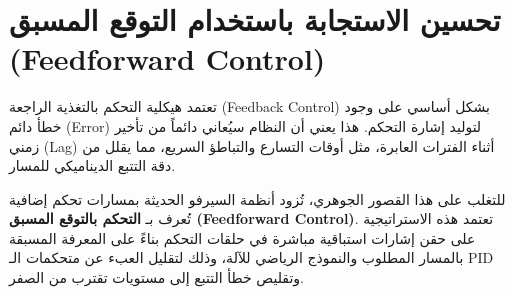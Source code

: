 \section{تحسين الاستجابة باستخدام التوقع المسبق (\textenglish{Feedforward Control})}
\label{sec:feedforward_control}

تعتمد هيكلية التحكم بالتغذية الراجعة (\textenglish{Feedback Control}) بشكل أساسي على وجود خطأ دائم (\textenglish{Error}) لتوليد إشارة التحكم. هذا يعني أن النظام سيُعاني دائماً من تأخير زمني (\textenglish{Lag}) أثناء الفترات العابرة، مثل أوقات التسارع والتباطؤ السريع، مما يقلل من دقة التتبع الديناميكي للمسار.

للتغلب على هذا القصور الجوهري، تُزود أنظمة السيرفو الحديثة بمسارات تحكم إضافية تُعرف بـ \textbf{التحكم بالتوقع المسبق (\textenglish{Feedforward Control})}. تعتمد هذه الاستراتيجية على حقن إشارات استباقية مباشرة في حلقات التحكم بناءً على المعرفة المسبقة بالمسار المطلوب والنموذج الرياضي للآلة، وذلك لتقليل العبء عن متحكمات الـ \textenglish{PID} وتقليص خطأ التتبع إلى مستويات تقترب من الصفر.

